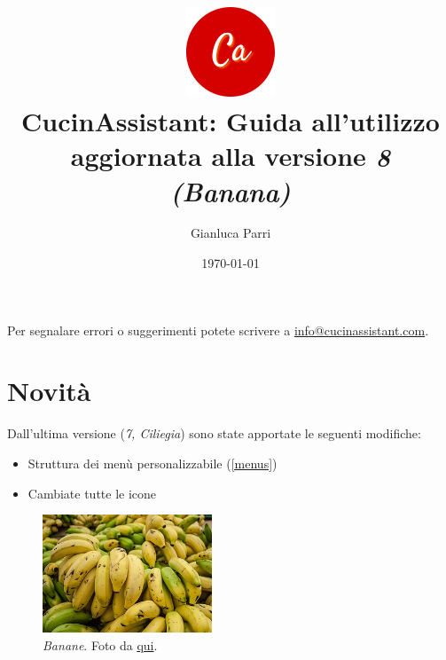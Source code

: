 \documentclass[12pt, a4paper]{article}
\begin{document}
    \title{
        \includegraphics[width=0.2\textwidth]{assets/logo.png}\\
        [0.5cm]CucinAssistant: Guida all'utilizzo\\
        \large aggiornata alla versione \emph{8 (Banana)}
    }
    \author{Gianluca Parri}
    \date{\today}
    \maketitle



    \tableofcontents
    \vfill
    \noindent Per segnalare errori o suggerimenti potete scrivere a
    \href{mailto:info@cucinassistant.com}{\mbox{info@cucinassistant.com}}.



    \section{Novità}
    
    Dall'ultima versione (\emph{7, Ciliegia}) sono state apportate le seguenti
    modifiche:

    \begin{itemize}
        \item Struttura dei menù personalizzabile (\ref{menus})
        \item Cambiate tutte le icone
    \end{itemize}

    \begin{figure}[H]
        \centering
        \includegraphics[width=0.45\textwidth]{assets/banane.jpg}
		\caption{\emph{Banane}. Foto da \href{https://commons.wikimedia.org/wi\
                ki/File:Cavendish_banana_from_Maracaibo.jpg}{qui}.}
    \end{figure}
\end{document}

